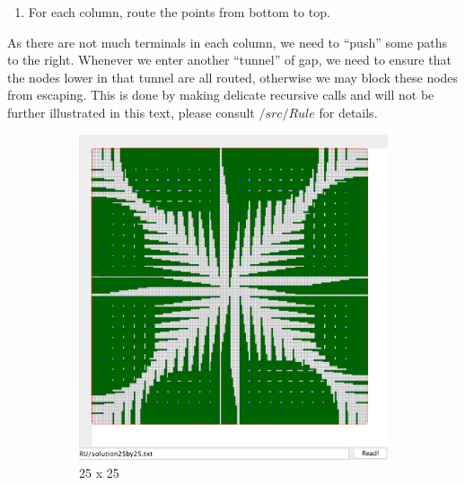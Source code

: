 \documentclass{article}
\begin{document}
\begin{spacing}{1.1}
\begin{enumerate}[label = \arabic*]
        \item For each column, route the points from bottom to top.
    \end{enumerate}
    As there are not much terminals in each column, we need to ``push'' some paths to the right. Whenever we enter another ``tunnel'' of gap, we need to ensure that the nodes lower in that tunnel are all routed, otherwise we may block these nodes from escaping. This is done
    by making delicate recursive calls and will not be further illustrated in this text, please consult $/src/Rule$ for details.
    \begin{figure}[H]
        \centering
        \begin{subfigure}{0.4\textwidth}
            \includegraphics[width = \textwidth]{RU0.png}
            \caption{25 x 25}
        \end{subfigure}
        \begin{subfigure}{0.4\textwidth}

\end{subfigure}
\end{figure}
\end{spacing}
\end{document}

